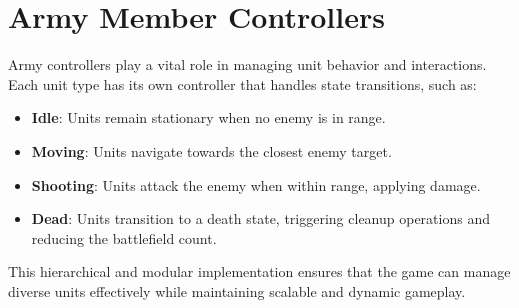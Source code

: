\section{Army Member Controllers}
Army controllers play a vital role in managing unit behavior and interactions. Each unit type has its own controller that handles state transitions, such as:
\begin{itemize}
    \item \textbf{Idle}: Units remain stationary when no enemy is in range.
    \item \textbf{Moving}: Units navigate towards the closest enemy target.
    \item \textbf{Shooting}: Units attack the enemy when within range, applying damage.
    \item \textbf{Dead}: Units transition to a death state, triggering cleanup operations and reducing the battlefield count.
\end{itemize}

This hierarchical and modular implementation ensures that the game can manage diverse units effectively while maintaining scalable and dynamic gameplay.
